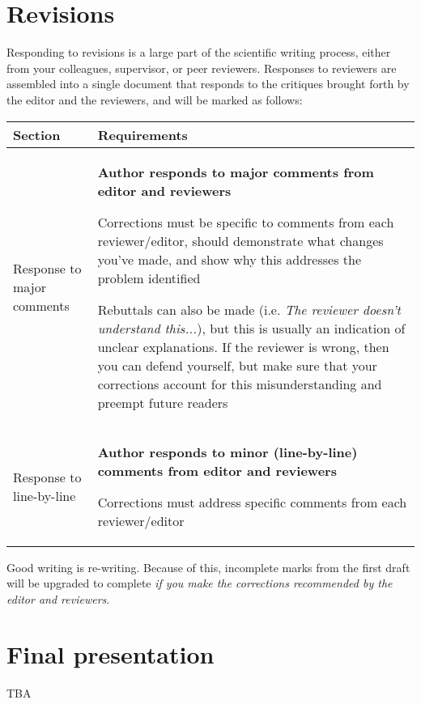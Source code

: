 \documentclass[11pt]{article}
\newcommand{\tabit}{\scriptsize\par\textbullet\phantom{ }}
\begin{document}
\section*{Revisions}

Responding to revisions is a large part of the scientific writing process, either from your colleagues, supervisor, or peer reviewers. Responses to reviewers are assembled into a single document that responds to the critiques brought forth by the editor and the reviewers, and will be marked as follows:

\begin{table}[h!]
\centering
\begin{tabular}{p{3cm}|p{12cm}}
\textbf{Section} & \textbf{Requirements} \\ \hline

Response to major comments & \textbf{Author responds to major comments from editor and reviewers} \tabit Corrections must be specific to comments from each reviewer/editor, should demonstrate what changes you've made, and show why this addresses the problem identified \tabit Rebuttals can also be made (i.e. \emph{The reviewer doesn't understand this...}), but this is usually an indication of unclear explanations. If the reviewer is wrong, then you can defend yourself, but make sure that your corrections account for this misunderstanding and preempt future readers \\ \hline
Response to line-by-line & \textbf{Author responds to minor (line-by-line) comments from editor and reviewers} \tabit Corrections must address specific comments from each reviewer/editor \\

\end{tabular}
\end{table}

Good writing is re-writing. Because of this, incomplete marks from the first draft will be upgraded to complete \emph{if you make the corrections recommended by the editor and reviewers}. 

\section*{Final presentation}

TBA
\end{document}
